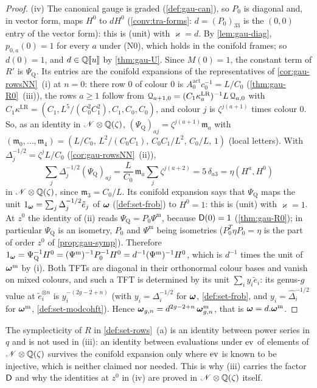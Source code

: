 \begin{proof}
(iv) The canonical gauge is graded (\cref{def:gau-can}), so $P_0$ is diagonal and, in vector form, maps $H^0$ to $dH^0$ (\cref{conv:tra-forms}: $d=(P_0)_{33}$ is the $(0,0)$ entry of the vector form): this is (unit) with $\varkappa=d$. By \cref{lem:gau-diag}, $p_{0,a}(0)=1$ for every $a$ under (N0), which holds in the conifold frames; so $d(0)=1$, and $d\in\mathbb{Q}[\![ u ]\!]$ by \cref{thm:gau-U}. Since $M(0)=1$, the constant term of $R'$ is $\Psi_{\mathrm Q}$. Its entries are the conifold expansions of the representatives of \cref{cor:gau-rowsNN}~(i) at $n=0$: there row $0$ of colour $0$ is $A^{\mathrm{act}}_0c_0^{-1}=L/C_0$ (\cref{thm:gau-R0}~(iii)), the rows $a\geq1$ follow from $\mathcal{Q}_{a+1,0}=(C_1\kappa^{\mathrm{LR}}_a)^{-1}L\,\mathcal{Q}_{a,0}$ with $C_1\kappa^{\mathrm{LR}}=(C_1,L^5/(C_0^2C_1^2),C_1,C_0,C_0)$, and colour $j$ is $\zeta^{j(a+1)}$ times colour $0$. So, as an identity in $\mathscr{N}\otimes\mathbb{Q}(\zeta)$, $(\Psi_{\mathrm Q})_{aj}=\zeta^{j(a+1)}\mathfrak m_a$ with $(\mathfrak m_0,\dots,\mathfrak m_4)=(L/C_0,\,L^2/(C_0C_1),\,C_0C_1/L^2,\,C_0/L,\,1)$ (local letters). With $\Delta_j^{-1/2}=\zeta^jL/C_0$ (\cref{cor:gau-rowsNN}~(ii)),
\[
\textstyle\sum_j\Delta_j^{-1/2}(\Psi_{\mathrm Q})_{aj}=\frac L{C_0}\,\mathfrak m_a\sum_j\zeta^{j(a+2)}=5\,\delta_{a3}=\eta(H^a,H^0)
\]
in $\mathscr{N}\otimes\mathbb{Q}(\zeta)$, since $\mathfrak m_3=C_0/L$. Its conifold expansion says that $\Psi_{\mathrm Q}$ maps the unit $1_{\boldsymbol{\omega}}=\sum_j\Delta_j^{-1/2}\tilde e_j$ of $\boldsymbol{\omega}$ (\cref{def:set-frob}) to $H^0=1$: this is (unit) with $\varkappa=1$. At $z^0$ the identity of (ii) reads $\Psi_{\mathrm Q}=P_0\Psi^{\mathrm m}$, because $\mathsf{D}(0)=1$ (\cref{thm:gau-R0}); in particular $\Psi_{\mathrm Q}$ is an isometry, $P_0$ and $\Psi^{\mathrm m}$ being isometries ($P_0^T\eta P_0=\eta$ is the part of order $z^0$ of \cref{prop:gau-symp}). Therefore $1_{\boldsymbol{\omega}}=\Psi_{\mathrm Q}^{-1}H^0=(\Psi^{\mathrm m})^{-1}P_0^{-1}H^0=d^{-1}(\Psi^{\mathrm m})^{-1}H^0$, which is $d^{-1}$ times the unit of $\boldsymbol{\omega}^{\mathrm m}$ by (i). Both TFTs are diagonal in their orthonormal colour bases and vanish on mixed colours, and such a TFT is determined by its unit $\sum_iy_i\tilde e_i$: its genus-$g$ value at $\tilde e_i^{\otimes n}$ is $y_i^{-(2g-2+n)}$ (with $y_i=\Delta_i^{-1/2}$ for $\boldsymbol{\omega}$, \cref{def:set-frob}, and $y_i=\hat\Delta_i^{-1/2}$ for $\boldsymbol{\omega}^{\mathrm m}$, \cref{def:set-modcohft}). Hence $\boldsymbol{\omega}_{g,n}=d^{2g-2+n}\,\boldsymbol{\omega}^{\mathrm m}_{g,n}$, that is $\boldsymbol{\omega}=d.\boldsymbol{\omega}^{\mathrm m}$.
\end{proof}

The symplecticity of $R$ in \cref{def:set-rows}~(a) is an identity between power series in $q$ and is not used in (iii): an identity between evaluations under $\operatorname{ev}$ of elements of $\mathscr{N}\otimes\mathbb{Q}(\zeta)$ survives the conifold expansion only where $\operatorname{ev}$ is known to be injective, which is neither claimed nor needed. This is why (iii) carries the factor $\mathsf{D}$ and why the identities at $z^0$ in (iv) are proved in $\mathscr{N}\otimes\mathbb{Q}(\zeta)$ itself.

